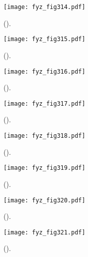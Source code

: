   \begin{figure}[ht!]  %
    \centering
    \texttt{[image: fyz\_fig314.pdf]}
    \caption{
             (\cite[s.~148]{Feynman02}).}
    \label{fyz:fig314}
  \end{figure}

  \begin{figure}[ht!]  %
    \centering
    \texttt{[image: fyz\_fig315.pdf]}
    \caption{
             (\cite[s.~148]{Feynman02}).}
    \label{fyz:fig315}
  \end{figure}

  \begin{figure}[ht!]  %
    \centering
    \texttt{[image: fyz\_fig316.pdf]}
    \caption{
             (\cite[s.~148]{Feynman02}).}
    \label{fyz:fig316}
  \end{figure}
  
  \begin{figure}[ht!]  %
    \centering
    \texttt{[image: fyz\_fig317.pdf]}
    \caption{
             (\cite[s.~148]{Feynman02}).}
    \label{fyz:fig317}
  \end{figure}

  \begin{figure}[ht!]  %
    \centering
    \texttt{[image: fyz\_fig318.pdf]}
    \caption{
             (\cite[s.~148]{Feynman02}).}
    \label{fyz:fig318}
  \end{figure}

  \begin{figure}[ht!]  %
    \centering
    \texttt{[image: fyz\_fig319.pdf]}
    \caption{
             (\cite[s.~148]{Feynman02}).}
    \label{fyz:fig319}
  \end{figure}

  \begin{figure}[ht!]  %
    \centering
    \texttt{[image: fyz\_fig320.pdf]}
    \caption{
             (\cite[s.~148]{Feynman02}).}
    \label{fyz:fig320}
  \end{figure}

  \begin{figure}[ht!]  %
    \centering
    \texttt{[image: fyz\_fig321.pdf]}
    \caption{
             (\cite[s.~148]{Feynman02}).}
    \label{fyz:fig321}
  \end{figure}

